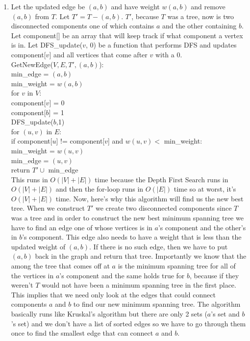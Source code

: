 \documentclass{article}
\begin{document}
\begin{enumerate}
	\item Let the updated edge be $(a,b)$ and have weight $w(a,b)$ and remove $(a,b)$ from $T$. Let $T' = T - (a,b)$. $T'$, because $T$ was a tree, now is two disconnected components one of which contains $a$ and the other containing $b$.  Let component[] be an array that will keep track if what component a vertex is in.  Let DFS\_update($v$, 0) be a function that performs DFS and updates component[$v$] and all vertices that come after $v$ with a 0.  \\
	GetNewEdge($V,E,T',(a,b)$): \\
	\hspace*{0.5 in} min\_edge = $(a,b)$ \\
	\hspace*{0.5 in} min\_weight = $w(a,b)$ \\
	\hspace*{0.5 in} for $v$ in $V$: \\
	\hspace*{1.0 in} 	component[$v$] = 0 \\
	\hspace*{0.5 in} component[$b$] = 1 \\
	\hspace*{0.5 in} DFS\_update($b$,1) \\
	\hspace*{0.5 in} for $(u,v)$ in $E$: \\
	\hspace*{1.0 in} 	if component[$u$] != component[$v$] and $w(u,v) <$ min\_weight: \\
	\hspace*{1.5 in}		min\_weight = $w(u,v)$ \\
	\hspace*{1.5 in}		min\_edge   =  $(u,v)$ \\
	\hspace*{0.5 in} return $T' \cup $ min\_edge \\
	This runs in $O(|V|+|E|)$ time because the Depth First Search runs in $O(|V| + |E|)$  and then the for-loop runs in $O(|E|)$ time so at worst, it's $O(|V|+|E|)$ time.  Now, here's why this algorithm will find us the new best tree.  When we construct $T'$ we create two disconnected components since $T$ was a tree and in order to construct the new best minimum spanning tree we have to find an edge one of whose vertices is in $a$'s component and the other's in $b$'s component.  This edge also needs to have a weight that is less than the updated weight of $(a,b)$.  If there is no such edge, then we have to put $(a,b)$ back in the graph and return that tree.  Importantly we know that the among the tree that comes off at $a$ is the minimum spanning tree for all of the vertices in $a$'s component and the same holds true for $b$, because if they weren't $T$ would not have been a minimum spanning tree in the first place.  This implies that we need only look at the edges that could connect components $a$ and $b$ to find our new minimum spanning tree.  The algorithm basically runs like Kruskal's algorithm but there are only 2 sets ($a$'s set and $b$'s set) and we don't have a list of sorted edges so we have to go through them once to find the smallest edge that can connect $a$ and $b$.  
	

\end{enumerate}
\end{document}
